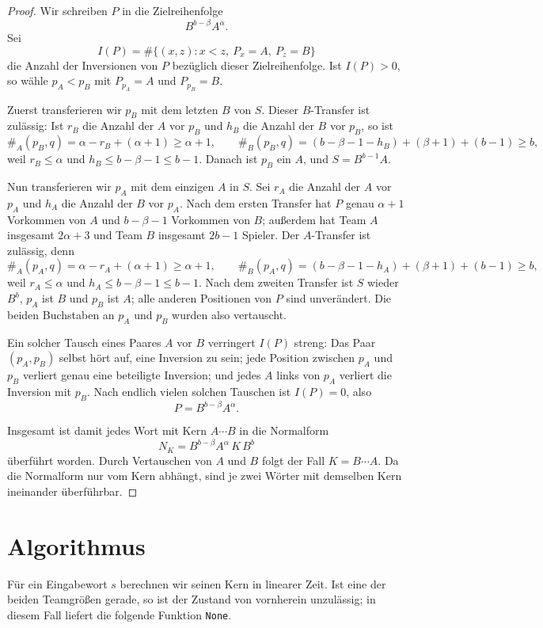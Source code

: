 \documentclass[11pt,a4paper]{article}
\begin{document}
\begin{proof}
Wir schreiben $P$ in die Zielreihenfolge
\[
B^{b-\beta}A^{\alpha}.
\]
Sei
\[
I(P)=\#\{(x,z):x<z,\ P_x=A,\ P_z=B\}
\]
die Anzahl der Inversionen von $P$ bez\"uglich dieser Zielreihenfolge.
Ist $I(P)>0$, so w\"ahle $p_A<p_B$ mit $P_{p_A}=A$ und
$P_{p_B}=B$.

Zuerst transferieren wir $p_B$ mit dem letzten $B$ von $S$.  Dieser
$B$-Transfer ist zul\"assig: Ist $r_B$ die Anzahl der $A$ vor $p_B$
und $h_B$ die Anzahl der $B$ vor $p_B$, so ist
\[
\#_A(p_B,q)=\alpha-r_B+(\alpha+1)
\ge \alpha+1,
\qquad
\#_B(p_B,q)=(b-\beta-1-h_B)+(\beta+1)+(b-1)
\ge b,
\]
weil $r_B\le\alpha$ und $h_B\le b-\beta-1\le b-1$.  Danach ist
$p_B$ ein $A$, und $S=B^{b-1}A$.

Nun transferieren wir $p_A$ mit dem einzigen $A$ in $S$.  Sei $r_A$
die Anzahl der $A$ vor $p_A$ und $h_A$ die Anzahl der $B$ vor $p_A$.
Nach dem ersten Transfer hat $P$ genau $\alpha+1$ Vorkommen von $A$
und $b-\beta-1$ Vorkommen von $B$; au\ss erdem hat Team $A$ insgesamt
$2\alpha+3$ und Team $B$ insgesamt $2b-1$ Spieler.  Der $A$-Transfer
ist zul\"assig, denn
\[
\#_A(p_A,q)=\alpha-r_A+(\alpha+1)
\ge\alpha+1,
\qquad
\#_B(p_A,q)=(b-\beta-1-h_A)+(\beta+1)+(b-1)
\ge b,
\]
weil $r_A\le\alpha$ und $h_A\le b-\beta-1\le b-1$.  Nach dem
zweiten Transfer ist $S$ wieder $B^b$, $p_A$ ist $B$ und $p_B$ ist
$A$; alle anderen Positionen von $P$ sind unver\"andert.  Die beiden
Buchstaben an $p_A$ und $p_B$ wurden also vertauscht.

Ein solcher Tausch eines Paares $A$ vor $B$ verringert $I(P)$ streng:
Das Paar $(p_A,p_B)$ selbst h\"ort auf, eine Inversion zu sein; jede
Position zwischen $p_A$ und $p_B$ verliert genau eine beteiligte
Inversion; und jedes $A$ links von $p_A$ verliert die Inversion mit
$p_B$.  Nach endlich vielen solchen Tauschen ist $I(P)=0$, also
\[
P=B^{b-\beta}A^{\alpha}.
\]

Insgesamt ist damit jedes Wort mit Kern $A\cdots B$ in die
Normalform
\[
N_K=B^{b-\beta}A^{\alpha}\,K\,B^{b}
\]
\"uberf\"uhrt worden.  Durch Vertauschen von $A$ und $B$ folgt der Fall
$K=B\cdots A$.  Da die Normalform nur vom Kern abh\"angt, sind je zwei
W\"orter mit demselben Kern ineinander \"uberf\"uhrbar.
\end{proof}

\section{Algorithmus}

F\"ur ein Eingabewort $s$ berechnen wir seinen Kern in linearer Zeit.
Ist eine der beiden Teamgr\"o\ss en gerade, so ist der Zustand von
vornherein unzul\"assig; in diesem Fall liefert die folgende Funktion
\texttt{None}.
\end{document}

